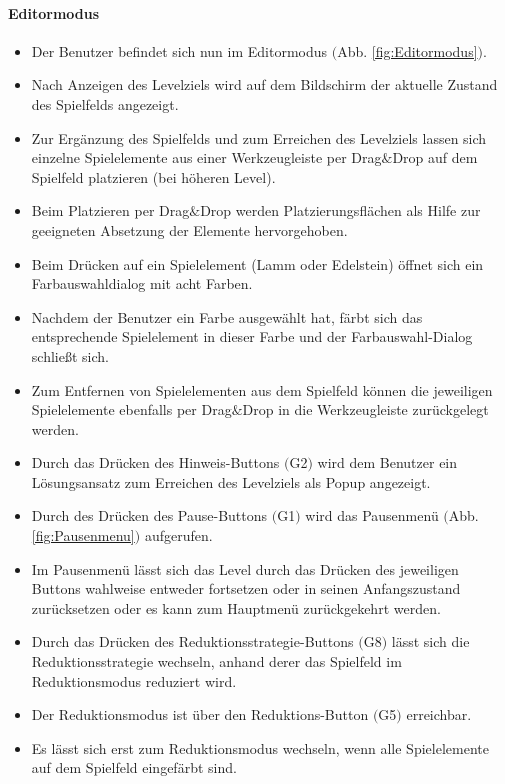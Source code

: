 \paragraph{Editormodus}
\begin{itemize}
\item Der Benutzer befindet sich nun im Editormodus $($Abb. \ref{fig:Editormodus}$)$.
	\item Nach Anzeigen des Levelziels wird auf dem Bildschirm der aktuelle Zustand des Spielfelds angezeigt.
	\item Zur Ergänzung des Spielfelds und zum Erreichen des Levelziels lassen sich einzelne Spielelemente aus einer Werkzeugleiste per Drag$\&$Drop auf dem Spielfeld platzieren (bei höheren Level).
	\item Beim Platzieren per Drag$\&$Drop werden Platzierungsflächen als Hilfe zur geeigneten Absetzung der Elemente hervorgehoben.
	\item Beim Drücken auf ein Spielelement (Lamm oder Edelstein) öffnet sich ein Farbauswahldialog mit acht Farben.
	\item Nachdem der Benutzer ein Farbe ausgewählt hat, färbt sich das entsprechende Spielelement in dieser Farbe und der Farbauswahl-Dialog schließt sich.
	\item Zum Entfernen von Spielelementen aus dem Spielfeld können die jeweiligen Spielelemente ebenfalls per Drag$\&$Drop in die Werkzeugleiste zurückgelegt werden.
	\item Durch das Drücken des Hinweis-Buttons $($G2$)$ wird dem Benutzer ein Lösungsansatz zum Erreichen des Levelziels als Popup angezeigt.
	\item Durch des Drücken des Pause-Buttons $($G1$)$ wird das Pausenmenü $($Abb. \ref{fig:Pausenmenu}$)$ aufgerufen.
	\item Im Pausenmenü lässt sich das Level durch das Drücken des jeweiligen Buttons wahlweise entweder fortsetzen oder in seinen Anfangszustand zurücksetzen oder es kann zum Hauptmenü zurückgekehrt werden.
	\item Durch das Drücken des Reduktionsstrategie-Buttons $($G8$)$ lässt sich die Reduktionsstrategie wechseln, anhand derer das Spielfeld im Reduktionsmodus reduziert wird.
	\item Der Reduktionsmodus ist über den Reduktions-Button $($G5$)$ erreichbar. 
	\item Es lässt sich erst zum Reduktionsmodus wechseln, wenn alle Spielelemente auf dem Spielfeld eingefärbt sind.
\end{itemize}

